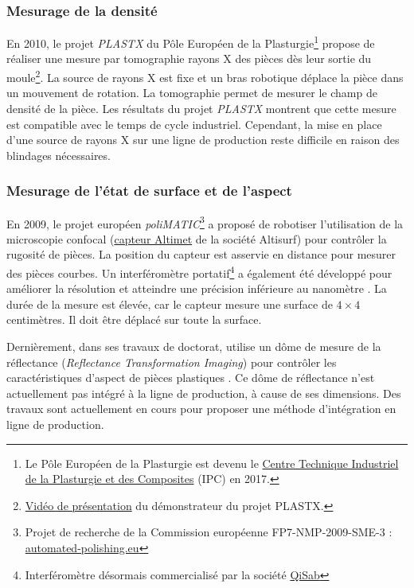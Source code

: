 \subsubsection{Mesurage de la densité}
En 2010, le projet \textit{PLASTX} du Pôle Européen de la Plasturgie\footnote{Le Pôle Européen de la Plasturgie est devenu le \href{https://ct-ipc.com/}{Centre Technique Industriel de la Plasturgie et des Composites} (IPC) en 2017.} propose de réaliser une mesure par tomographie rayons X des pièces dès leur sortie du moule\footnote{\href{https://vimeo.com/50358748}{Vidéo de présentation} du démonstrateur du projet PLASTX.}.
La source de rayons X est fixe et un bras robotique déplace la pièce dans un mouvement de rotation.
La tomographie permet de mesurer le champ de densité de la pièce.  %
Les résultats du projet \textit{PLASTX} montrent que cette mesure est compatible avec le temps de cycle industriel.
Cependant, la mise en place d'une source de rayons X sur une ligne de production reste difficile en raison des blindages nécessaires.

\subsubsection{Mesurage de l'état de surface et de l'aspect}
En 2009, le projet européen \textit{poliMATIC}\footnote{Projet de recherche de la Commission européenne FP7-NMP-2009-SME-3 : \href{https://www.automated-polishing.eu/}{automated-polishing.eu}} a proposé de robotiser l'utilisation de la microscopie confocal (\href{https://www.altimet.fr/?page_id=248}{capteur Altimet} de la société Altisurf) pour contrôler la rugosité de pièces.
La position du capteur est asservie en distance pour mesurer des pièces courbes.
Un interféromètre portatif\footnote{Interféromètre désormais commercialisé par la société \href{http://qisab.com/}{QiSab}} a également été développé pour améliorer la résolution et atteindre une précision inférieure au nanomètre \cite{baath_new_2012}.
La durée de la mesure est élevée, car le capteur mesure une surface de $4\times 4$ centimètres.
Il doit être déplacé sur toute la surface.

Dernièrement, dans ses travaux de doctorat, \citeauthor{lacombe_exploitation_2018a} utilise un dôme de mesure de la réflectance (\textit{Reflectance Transformation Imaging}) pour contrôler les caractéristiques d'aspect de pièces plastiques \cite{lacombe_exploitation_2018a}.
Ce dôme de réflectance n'est actuellement pas intégré à la ligne de production, à cause de ses dimensions.
Des travaux sont actuellement en cours pour proposer une méthode d'intégration en ligne de production.

